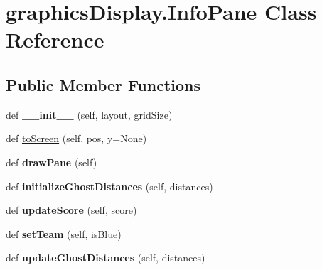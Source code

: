 \hypertarget{classgraphics_display_1_1_info_pane}{}\section{graphics\+Display.\+Info\+Pane Class Reference}
\label{classgraphics_display_1_1_info_pane}
\subsection*{Public Member Functions}
\begin{DoxyCompactItemize}
\item 
\mbox{\label{classgraphics_display_1_1_info_pane_aca3d7061176d3c4fa30ec5867402521b}} 
def {\bfseries \+\_\+\+\_\+init\+\_\+\+\_\+} (self, layout, grid\+Size)
\item 
def \hyperlink{classgraphics_display_1_1_info_pane_a187bf3ca47cd15c70a31d389463dfc62}{to\+Screen} (self, pos, y=None)
\item 
\mbox{\label{classgraphics_display_1_1_info_pane_a8ab2aa721210b0c4fc4cf98725abfbb7}} 
def {\bfseries draw\+Pane} (self)
\item 
\mbox{\label{classgraphics_display_1_1_info_pane_ac1ab4316ce7cab83076301d8d8c073a2}} 
def {\bfseries initialize\+Ghost\+Distances} (self, distances)
\item 
\mbox{\label{classgraphics_display_1_1_info_pane_a9d4033159e219174a6ec86eb771d769b}} 
def {\bfseries update\+Score} (self, score)
\item 
\mbox{\label{classgraphics_display_1_1_info_pane_a9c14c0974008ee73bcab36130bf4c797}} 
def {\bfseries set\+Team} (self, is\+Blue)
\item 
\mbox{\label{classgraphics_display_1_1_info_pane_a1fc130f47191c9db681003b5eb32e5f8}} 
def {\bfseries update\+Ghost\+Distances} (self, distances)
\item 
\mbox{\label{classgraphics_display_1_1_info_pane_a6d6f3620e86b4440ee59aa7cdddb81c8}} 

\end{DoxyCompactItemize}
